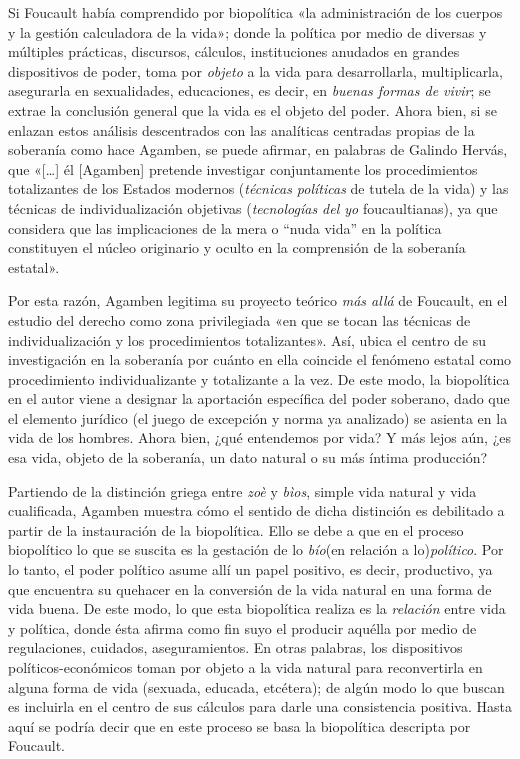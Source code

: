 Si Foucault había comprendido por biopolítica «la administración de los cuerpos y la gestión calculadora de la vida»; donde la política por medio de diversas y múltiples prácticas, discursos, cálculos, instituciones anudados en grandes dispositivos de poder, toma por \emph{objeto }a la vida para desarrollarla, multiplicarla, asegurarla en sexualidades, educaciones, es decir, en \emph{buenas formas de vivir}; se extrae la conclusión general que la vida es el objeto del poder. Ahora bien, si se enlazan estos análisis descentrados con las analíticas centradas propias de la soberanía como hace Agamben, se puede afirmar, en palabras de Galindo Hervás, que «{[}\ldots{]} él {[}Agamben{]} pretende investigar conjuntamente los procedimientos totalizantes de los Estados modernos (\emph{técnicas políticas }de tutela de la vida) y las técnicas de individualización objetivas (\emph{tecnologías del yo }foucaultianas), ya que considera que las implicaciones de la mera o ``nuda vida'' en la política constituyen el núcleo originario y oculto en la comprensión de la soberanía estatal».

Por esta razón, Agamben legitima su proyecto teórico \emph{más allá }de Foucault, en el estudio del derecho como zona privilegiada «en que se tocan las técnicas de individualización y los procedimientos totalizantes». Así, ubica el centro de su investigación en la soberanía por cuánto en ella coincide el fenómeno estatal como procedimiento individualizante y totalizante a la vez. De este modo, la biopolítica en el autor viene a designar la aportación específica del poder soberano, dado que el elemento jurídico (el juego de excepción y norma ya analizado) se asienta en la vida de los hombres. Ahora bien, ¿qué entendemos por vida? Y más lejos aún, ¿es esa vida, objeto de la soberanía, un dato natural o su más íntima producción?

Partiendo de la distinción griega entre \emph{zoè }y \emph{bìos}, simple vida natural y vida cualificada, Agamben muestra cómo el sentido de dicha distinción es debilitado a partir de la instauración de la biopolítica. Ello se debe a que en el proceso biopolítico lo que se suscita es la gestación de lo \emph{bío}(en relación a lo)\emph{político}. Por lo tanto, el poder político asume allí un papel positivo, es decir, productivo, ya que encuentra su quehacer en la conversión de la vida natural en una forma de vida buena. De este modo, lo que esta biopolítica realiza es la \emph{relación} entre vida y política, donde ésta afirma como fin suyo el producir aquélla por medio de regulaciones, cuidados, aseguramientos. En otras palabras, los dispositivos políticos-económicos toman por objeto a la vida natural para reconvertirla en alguna forma de vida (sexuada, educada, etcétera); de algún modo lo que buscan es incluirla en el centro de sus cálculos para darle una consistencia positiva. Hasta aquí se podría decir que en este proceso se basa la biopolítica descripta por Foucault.

